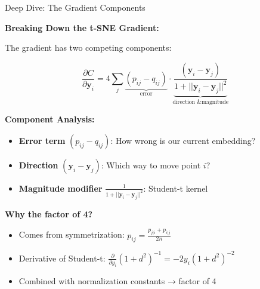 \documentclass[10pt]{beamer}
\begin{document}
\begin{frame}{Deep Dive: The Gradient Components}

\textbf{Breaking Down the t-SNE Gradient:}

\vspace{0.2cm}
The gradient has two competing components:

\begin{equation}
\frac{\partial C}{\partial \mathbf{y}_i} = 4 \sum_j \underbrace{(p_{ij} - q_{ij})}_{\text{error}} \cdot \underbrace{\frac{(\mathbf{y}_i - \mathbf{y}_j)}{1 + ||\mathbf{y}_i - \mathbf{y}_j||^2}}_{\text{direction \& magnitude}}
\end{equation}

\vspace{0.2cm}
\textbf{Component Analysis:}
\begin{itemize}
    \setlength\itemsep{0em}
    \item \textbf{Error term} $(p_{ij} - q_{ij})$: How wrong is our current embedding?
    \item \textbf{Direction} $(\mathbf{y}_i - \mathbf{y}_j)$: Which way to move point $i$?
    \item \textbf{Magnitude modifier} $\frac{1}{1 + ||\mathbf{y}_i - \mathbf{y}_j||^2}$: Student-t kernel
\end{itemize}

\vspace{0.2cm}
\textbf{Why the factor of 4?}
\begin{itemize}
    \setlength\itemsep{0em}
    \item Comes from symmetrization: $p_{ij} = \frac{p_{j|i} + p_{i|j}}{2n}$
    \item Derivative of Student-t: $\frac{\partial}{\partial y_i}(1 + d^2)^{-1} = -2y_i(1 + d^2)^{-2}$
    \item Combined with normalization constants → factor of 4
\end{itemize}

\end{frame}
\end{document}
